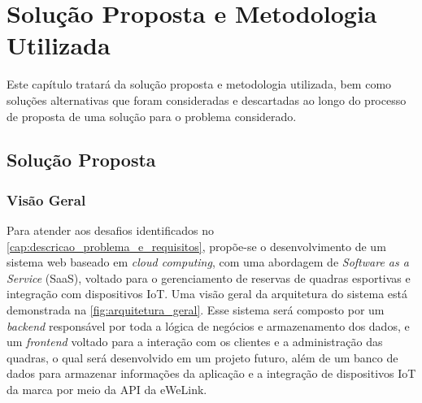 \chapter{Solução Proposta e Metodologia Utilizada}\label{cap:solucao_proposta}

Este capítulo tratará da solução proposta e metodologia utilizada, bem como soluções alternativas que foram consideradas e descartadas ao longo do processo de proposta de uma solução para o problema considerado.






\section{Solução Proposta}

\subsection{Visão Geral}
Para atender aos desafios identificados no \autoref{cap:descricao_problema_e_requisitos}, propõe-se o desenvolvimento de um sistema web baseado em \textit{cloud computing}, com uma abordagem de \textit{Software as a Service} (SaaS), voltado para o gerenciamento de reservas de quadras esportivas e integração com dispositivos IoT. Uma visão geral da arquitetura do sistema está demonstrada na \autoref{fig:arquitetura_geral}. Esse sistema será composto por um \textit{backend} responsável por toda a lógica de negócios e armazenamento dos dados, e um \textit{frontend} voltado para a interação com os clientes e a administração das quadras, o qual será desenvolvido em um projeto futuro, além de um banco de dados para armazenar informações da aplicação e a integração de dispositivos IoT da marca \cite{Sonoff} por meio da API da eWeLink.

